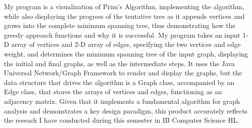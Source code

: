 \documentclass{article}
\begin{document}
My program is a visualization of Prim’s Algorithm, implementing the algorithm, while also displaying the progress of the tentative tree as it appends vertices and grows into the complete minimum spanning tree, thus demonstrating how the greedy approach functions and why it is successful. My program takes an input 1-D array of vertices and 2-D array of edges, specifying the two vertices and edge weight, and determines the minimum spanning tree of the input graph, displaying the initial and final graphs, as well as the intermediate steps. It uses the Java Universal Network/Graph Framework to render and display the graphs, but the data structure that drives the algorithm is a Graph class, accompanied by an Edge class, that stores the arrays of vertices and edges, functioning as an adjacency matrix. Given that it implements a fundamental algorithm for graph analysis and demonstrates a key design paradigm, this product accurately reflects the reseach I have conducted during this semester in IB Computer Science HL.
\end{document}
